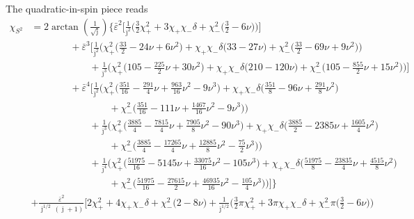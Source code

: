 \documentclass[prd,superscriptaddress,preprintnumbers,tightenlines,nofootinbib, eqsecnum]{revtex4-2}
\newcommand{\nn}{\nonumber}
\begin{document}
The quadratic-in-spin piece reads
\begin{align}
\chi_{S^2} &= 2\arctan\!\left(\frac{1}{\sqrt{\bar{\jmath}}}\right)\Bigg\{\bar{\varepsilon}^{2}\Bigg[
\frac{1}{\bar{\jmath}^{2}}\Bigg(\frac{3}{2}\chi_{+}^{2} + 3\chi_{+}\chi_{-}\delta + \chi_{-}^{2}\bigg(\frac{3}{2} - 6 \nu\bigg)\Bigg)\Bigg] \nn \\
&\qquad\qquad + \bar{\varepsilon}^{3}\Bigg[
\frac{1}{\bar{\jmath}^{2}}\Bigg(\chi_{+}^{2}\bigg(\frac{33}{2} - 24 \nu + 6 \nu^{2}\bigg) + \chi_{+}\chi_{-}\delta\bigg(33 - 27 \nu\bigg) + \chi_{-}^{2}\bigg(\frac{33}{2} - 69 \nu + 9 \nu^{2}\bigg)\Bigg) \nn \\
&\qquad\qquad\qquad + \frac{1}{\bar{\jmath}^{3}}\Bigg(\chi_{+}^{2}\bigg(105 - \frac{225}{2}\nu + 30 \nu^{2}\bigg) + \chi_{+}\chi_{-}\delta\bigg(210 - 120 \nu\bigg) + \chi_{-}^{2}\bigg(105 - \frac{855}{2}\nu + 15 \nu^{2}\bigg)\Bigg)\Bigg] \nn \\
&\qquad\qquad + \bar{\varepsilon}^{4}\Bigg[
\frac{1}{\bar{\jmath}^{2}}\Bigg(\chi_{+}^{2}\bigg(\frac{351}{16} - \frac{291}{4}\nu + \frac{963}{16}\nu^{2} - 9 \nu^{3}\bigg) + \chi_{+}\chi_{-}\delta\bigg(\frac{351}{8} - 96 \nu + \frac{291}{8}\nu^{2}\bigg)\nn\\
&\qquad\qquad\qquad\qquad+ \chi_{-}^{2}\bigg(\frac{351}{16} - 111 \nu + \frac{1467}{16}\nu^{2} - 9 \nu^{3}\bigg)\Bigg) \nn \\
&\qquad\qquad\qquad + \frac{1}{\bar{\jmath}^{3}}\Bigg(\chi_{+}^{2}\bigg(\frac{3885}{4} - \frac{7815}{4}\nu + \frac{7905}{8}\nu^{2} - 90 \nu^{3}\bigg) + \chi_{+}\chi_{-}\delta\bigg(\frac{3885}{2} - 2385 \nu + \frac{1605}{4}\nu^{2}\bigg) \nn \\
&\qquad\qquad\qquad\qquad + \chi_{-}^{2}\bigg(\frac{3885}{4} - \frac{17265}{4}\nu + \frac{12885}{8}\nu^{2} - \frac{75}{2}\nu^{3}\bigg)\Bigg) \nn \\
&\qquad\qquad\qquad + \frac{1}{\bar{\jmath}^{4}}\Bigg(\chi_{+}^{2}\bigg(\frac{51975}{16} - 5145 \nu + \frac{33075}{16}\nu^{2} - 105 \nu^{3}\bigg) + \chi_{+}\chi_{-}\delta\bigg(\frac{51975}{8} - \frac{23835}{4}\nu + \frac{4515}{8}\nu^{2}\bigg) \nn \\
&\qquad\qquad\qquad\qquad + \chi_{-}^{2}\bigg(\frac{51975}{16} - \frac{27615}{2}\nu + \frac{46935}{16}\nu^{2} - \frac{105}{4}\nu^{3}\bigg)\Bigg)\Bigg]\Bigg\} \nn \\
&+ \frac{\bar{\varepsilon}^{2}}{\bar{\jmath}^{1/2}\,(\bar{\jmath}+1)}\Bigg[
2\chi_{+}^{2} + 4\chi_{+}\chi_{-}\delta + \chi_{-}^{2}\bigg(2 - 8 \nu\bigg) + \frac{1}{\bar{\jmath}^{1/2}}\Bigg(\frac{3}{2}\pi\chi_{+}^{2} + 3 \pi\chi_{+}\chi_{-}\delta + \chi_{-}^{2}\pi\bigg(\frac{3}{2} - 6 \nu\bigg)\Bigg) \nn \\

\end{align}
\end{document}
